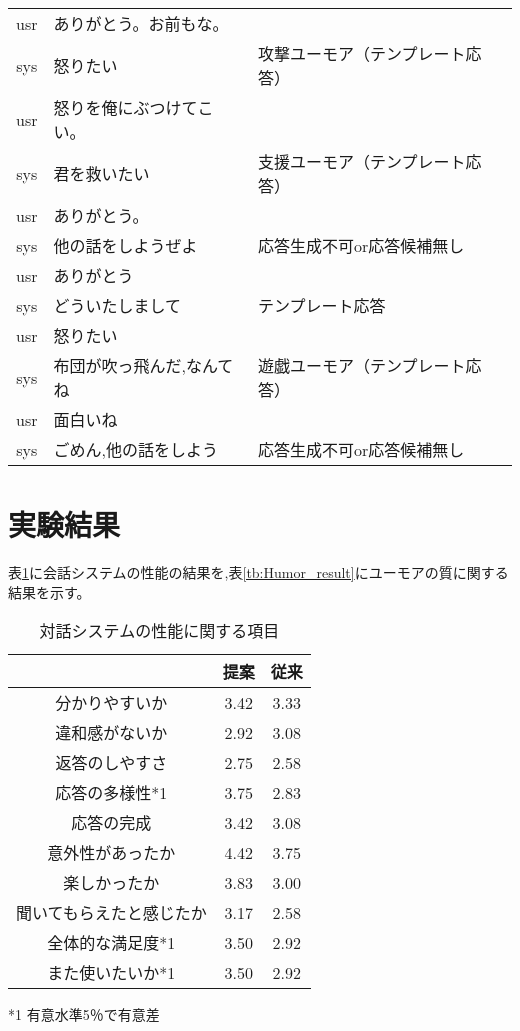 \begin{longtable}{| c | p{} | p{}|}
usr & ありがとう。お前もな。 & \\
sys & 怒りたい & 攻撃ユーモア（テンプレート応答）\\
usr & 怒りを俺にぶつけてこい。 & \\
sys & 君を救いたい & 支援ユーモア（テンプレート応答）\\
usr & ありがとう。 & \\
sys & 他の話をしようぜよ & 応答生成不可or応答候補無し\\
usr & ありがとう & \\
sys & どういたしまして & テンプレート応答\\
usr & 怒りたい & \\
sys & 布団が吹っ飛んだ,なんてね & 遊戯ユーモア（テンプレート応答）\\
usr & 面白いね & \\
sys & ごめん,他の話をしよう & 応答生成不可or応答候補無し\\
\hline
\end{longtable}



\section{実験結果}
表\ref{tb:Grice_result}に会話システムの性能の結果を,表\ref{tb:Humor_result}にユーモアの質に関する結果を示す。
\begin{table}[tb]
\begin{center}
\caption{対話システムの性能に関する項目}
\label{tb:Grice_result}
\begin{tabular}{|c||c|c|}
\hline
 & 提案 & 従来 \\
\hline\hline
分かりやすいか & 3.42  & 3.33  \\
\hline
違和感がないか & 2.92  & 3.08  \\
\hline
返答のしやすさ & 2.75  & 2.58  \\
\hline
応答の多様性*1 & 3.75  & 2.83  \\
\hline
応答の完成 & 3.42  & 3.08  \\
\hline
意外性があったか & 4.42  & 3.75  \\
\hline
楽しかったか & 3.83  & 3.00  \\
\hline
聞いてもらえたと感じたか & 3.17  & 2.58  \\
\hline
全体的な満足度*1 & 3.50  & 2.92  \\
\hline
また使いたいか*1 & 3.50  & 2.92  \\
\hline
\end{tabular}
\end{center}
\hspace{12zw}*1 有意水準5％で有意差
\end{table}



